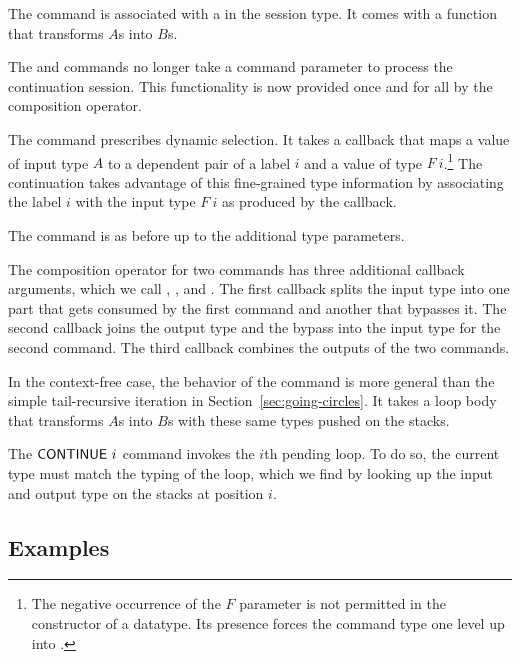 \documentclass[acmsmall,review,anonymous,screen]{acmart}
\begin{document}
The {\ACSKIP} command is associated with a {\Atcfskip} in the session
type. It comes with a function that transforms $A$s into $B$s.

The {\ACSEND} and {\ACRECV} commands no longer take a command parameter
to process the continuation session. This functionality is now
provided once and for all by the composition operator.

The command {\ACSELECT} prescribes dynamic selection. It takes a
callback that maps a value of input type $A$ to a dependent pair of a
label $i$ and a value of type $F~i$.\footnote{The negative occurrence
  of the $F$ parameter is not permitted in the constructor of a
  {\ASet} datatype. Its presence forces the command type one level up
  into {\ASetOne}.} The continuation takes advantage of this
fine-grained type information by associating the label $i$ with the
input type $F~i$ as produced by the callback.

The {\ACCHOICE} command is as before up to the additional type parameters.

The composition operator for two commands has three additional
callback arguments, which we call {\Asplit}, {\Across}, and
{\Ajoin}. The first callback {\Asplit} splits the input type into one part that gets
consumed by the first command and another that bypasses it.
The second callback {\Across} joins the output type and the bypass into the
input type for the second command.
The third callback {\Ajoin} combines the outputs of the two commands.

In the context-free case, the behavior of the {\AMU} command is more
general than the simple tail-recursive iteration in
Section~\ref{sec:going-circles}. It takes a loop body that transforms
$A$s into $B$s with these same types pushed on the stacks.

The {$\ACONTINUE~i$} command invokes the $i$th pending loop. To do so,
the current type must match the typing of the loop, which we find by
looking up the input and output type on the stacks at position $i$.

\subsection{Examples}
\label{sec:examples}
\end{document}
